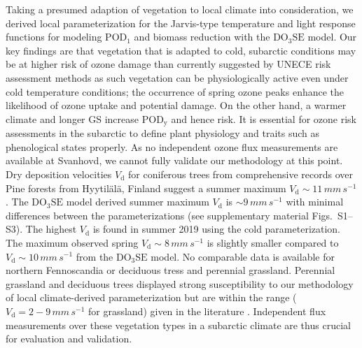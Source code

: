 \documentclass[bg, manuscript]{copernicus}
\begin{document}
Taking a presumed adaption of vegetation to local climate into consideration, we derived local parameterization for the Jarvis-type temperature and light response functions for modeling $\mathrm{POD_1}$ and biomass reduction with the $\mathrm{DO_3SE}$ model. Our key findings are that vegetation that is adapted to cold, subarctic conditions may be at higher risk of ozone damage than currently suggested by UNECE risk assessment methods as such vegetation can be physiologically active even under cold temperature conditions; the occurrence of spring ozone peaks enhance the likelihood of ozone uptake and potential damage. On the other hand, a warmer climate and longer GS increase $\mathrm{POD_y}$ and hence risk. It is essential for ozone risk assessments in the subarctic to define plant physiology and traits such as phenological states properly. As no independent ozone flux measurements are available at Svanhovd, we cannot fully validate our methodology at this point. 
Dry deposition velocities $V_\mathrm{d}$ for coniferous trees from comprehensive records over Pine forests from Hyytilälä, Finland \citep{BER:Keronen2003} suggest a summer maximum $V_\mathrm{d}\sim 11\,\unit{mm\,s^{-1}}$. The $\mathrm{DO_3SE}$ model derived summer maximum $V_\mathrm{d}$ is $\sim 9\,\unit{mm\,s^{-1}}$ with minimal differences between the parameterizations (see supplementary material Figs.~S1--S3). The highest $V_\mathrm{d}$ is found in summer 2019 using the cold parameterization. The maximum observed spring $V_\mathrm{d}\sim 8\,\unit{mm\,s^{-1}}$ is slightly smaller compared to $V_\mathrm{d}\sim 10\,\unit{mm\,s^{-1}}$ from the $\mathrm{DO_3SE}$ model. No comparable data is available for northern Fennoscandia or deciduous tress and perennial grassland. Perennial grassland and deciduous trees displayed strong susceptibility to our methodology of local climate-derived parameterization but are within the range ($V_\mathrm{d} = 2-9\,\unit{mm\,s^{-1}}$ for grassland) given in the literature \citep[e.g.][]{JGR:Jacob1992,AE:Padro1996,RG:Clifton2020}. Independent flux measurements over these vegetation types in a subarctic climate are thus crucial for evaluation and validation. 
\end{document}
